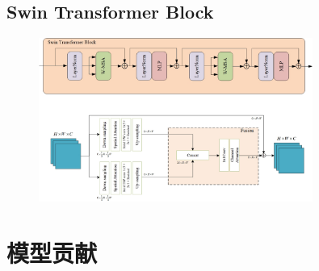 \documentclass[CJK,aspectratio=169]{beamer}  %
\begin{document}
	
	\subsection{Swin Transformer Block}
	
	\begin{frame}
		
		\begin{figure}[htbp]
			\begin{center}
				\includegraphics[width=0.8\textwidth]{picture/LLIE/My Architecture/Swin Transformer}
			\end{center}
		\end{figure}
			
	\end{frame}
	
	\section{模型贡献}
	
\end{document}
